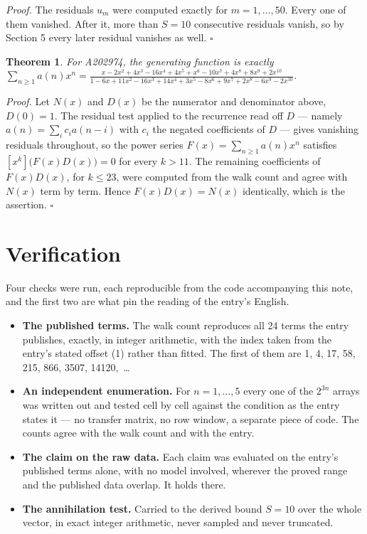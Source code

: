 \documentclass[11pt]{article}
\newtheorem{theorem}{Theorem}
\theoremstyle{definition}
\begin{document}
{\itshape Proof.} The residuals $u_m$ were computed exactly for $m = 1,\dots,50$. Every one of them vanished. After it, more than $S = 10$ consecutive residuals vanish, so by Section 5 every later residual vanishes as well. $\square$

\begin{theorem} For A202974, the generating function is exactly $\sum_{n\ge 1} a(n)x^n = \frac{x - 2x^{2} + 4x^{3} - 16x^{4} + 4x^{5} + x^{6} - 10x^{7} + 4x^{8} + 8x^{9} + 2x^{10}}{1 - 6x + 11x^{2} - 16x^{3} + 14x^{4} + 3x^{5} - 8x^{6} + 9x^{7} + 2x^{8} - 6x^{9} - 2x^{10}}$.\end{theorem}

{\itshape Proof.} Let $N(x)$ and $D(x)$ be the numerator and denominator above, $D(0)=1$. The residual test applied to the recurrence read off $D$ --- namely $a(n) = \sum_i c_i a(n-i)$ with $c_i$ the negated coefficients of $D$ --- gives vanishing residuals throughout, so the power series $F(x)=\sum_{n\ge 1}a(n)x^n$ satisfies $[x^k]\bigl(F(x)D(x)\bigr) = 0$ for every $k > 11$. The remaining coefficients of $F(x)D(x)$, for $k \le 23$, were computed from the walk count and agree with $N(x)$ term by term. Hence $F(x)D(x) = N(x)$ identically, which is the assertion. $\square$

\section{Verification}

Four checks were run, each reproducible from the code accompanying this note, and the first two are what pin the reading of the entry's English.

\begin{itemize}

\item {\bfseries The published terms.} The walk count reproduces all 24 terms the entry publishes, exactly, in integer arithmetic, with the index taken from the entry's stated offset (1) rather than fitted. The first of them are 1, 4, 17, 58, 215, 866, 3507, 14120,~\dots

\item {\bfseries An independent enumeration.} For $n = 1,\dots,5$ every one of the $2^{3n}$ arrays was written out and tested cell by cell against the condition as the entry states it --- no transfer matrix, no row window, a separate piece of code. The counts agree with the walk count and with the entry.

\item {\bfseries The claim on the raw data.} Each claim was evaluated on the entry's published terms alone, with no model involved, wherever the proved range and the published data overlap. It holds there.

\item {\bfseries The annihilation test.} Carried to the derived bound $S = 10$ over the whole vector, in exact integer arithmetic, never sampled and never truncated.

\end{itemize}
\end{document}

